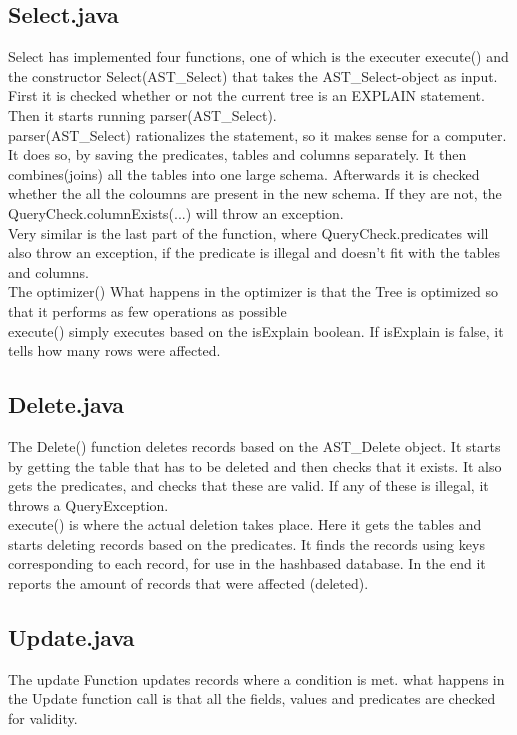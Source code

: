 \documentclass[a4paper,10pt,titlepage]{report}
\begin{document}
\subsection{Select.java}
Select has implemented four functions, one of which is the executer \textsf{execute()} and the constructor \textsf{Select(AST\_Select)} that takes the AST\_Select-object as input. First it is checked whether or not the current tree is an EXPLAIN statement. Then it starts running \textsf{parser(AST\_Select)}.
\\
\textsf{parser(AST\_Select)} rationalizes the statement, so it makes sense for a computer. It does so, by saving the predicates, tables and columns separately. It then combines(joins) all the tables into one large schema. Afterwards it is checked whether the all the coloumns are present in the new schema. If they are not, the \textsf{QueryCheck.columnExists(...)} will throw an exception.\\
Very similar is the last part of the function, where \textsf{QueryCheck.predicates} will also throw an exception, if the predicate is illegal and doesn't fit with the tables and columns.
\\
The \textsf{optimizer()} What happens in the optimizer is that the Tree is optimized so that it performs as few operations as possible
\\
\textsf{execute()} simply executes based on the \textsf{isExplain} boolean. If \textsf{isExplain} is false, it tells how many rows were affected.

\subsection{Delete.java}
The \textsf{Delete()} function deletes records based on the \textsf{AST\_Delete} object. It starts by getting the table that has to be deleted and then checks that it exists. It also gets the predicates, and checks that these are valid. If any of these is illegal, it throws a \textsf{QueryException}.
\\
\textsf{execute()} is where the actual deletion takes place. Here it gets the tables and starts deleting records based on the predicates. It finds the records using keys corresponding to each record, for use in the hashbased database. In the end it reports the amount of records that were affected (deleted).

\subsection{Update.java}
The update Function updates records where a condition is met. what happens in the Update function call is that all the fields, values and predicates are checked for validity.
\end{document}
